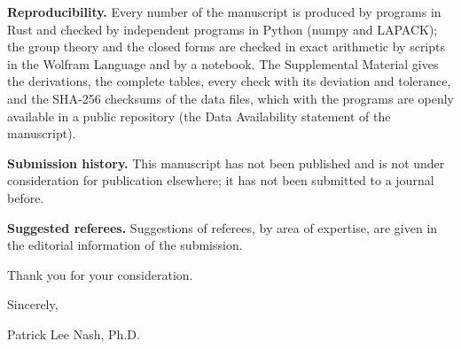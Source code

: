 \documentclass[11pt]{article}
\begin{document}
\textbf{Reproducibility.} Every number of the manuscript is produced by programs in Rust and checked by independent
programs in Python (numpy and LAPACK); the group theory and the closed forms are checked in exact arithmetic by scripts
in the Wolfram Language and by a notebook. The Supplemental Material gives the derivations, the complete tables, every
check with its deviation and tolerance, and the SHA-256 checksums of the data files, which with the programs are openly
available in a public repository (the Data Availability statement of the manuscript).

\textbf{Submission history.} This manuscript has not been published and is not under consideration for publication
elsewhere; it has not been submitted to a journal before.

\textbf{Suggested referees.} Suggestions of referees, by area of expertise, are given in the editorial information of
the submission.

Thank you for your consideration.

Sincerely,

Patrick Lee Nash, Ph.D.
\end{document}

